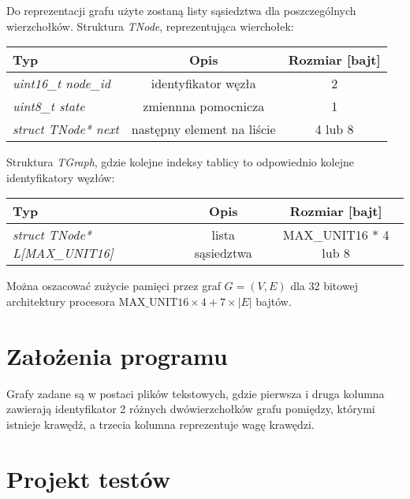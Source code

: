 \documentclass[a4paper, 10pt]{article}
\begin{document}
Do reprezentacji grafu użyte zostaną listy sąsiedztwa dla poszczególnych wierzchołków. Struktura
{\it TNode}, reprezentująca wierchołek:

\begin{tabular}{|l|c|c|}
	\hline 
  {\bf Typ} & {\bf Opis} & {\bf Rozmiar [bajt]}\\
  \hline 
  \it{uint16\_t node\_id} & identyfikator węzła & 2 \\
  \hline
  \it{ uint8\_t state} & zmiennna pomocnicza  &  1 \\
  \hline
  \it{ struct TNode* next} & następny element na liście & 4 lub 8 \\
  \hline 
\end{tabular} 

Struktura {\it TGraph}, gdzie kolejne indeksy tablicy to odpowiednio kolejne identyfikatory węzłów:

\begin{tabular}{|l|c|c|}
\hline {\bf Typ} & {\bf Opis} & {\bf Rozmiar [bajt]}\\
  \hline 
   \it{struct TNode* L[MAX\_UNIT16]  } & lista sąsiedztwa & MAX\_UNIT16 * 4 lub 8 \\
  \hline
\end{tabular} 

Można oszacować zużycie pamięci przez graf $G=(V,E)$ dla 32 bitowej architektury procesora $\text{MAX\_UNIT16}\times4+7\times|E|$ bajtów.



\section{Założenia programu}
Grafy zadane są w postaci plików tekstowych, gdzie pierwsza 
i druga kolumna zawierają identyfikator 2 różnych dwówierzchołków
grafu pomiędzy, którymi istnieje krawędź, a trzecia kolumna reprezentuje
wagę krawędzi.




\section{Projekt testów}
	
	





\nocite{*}

\end{document}
